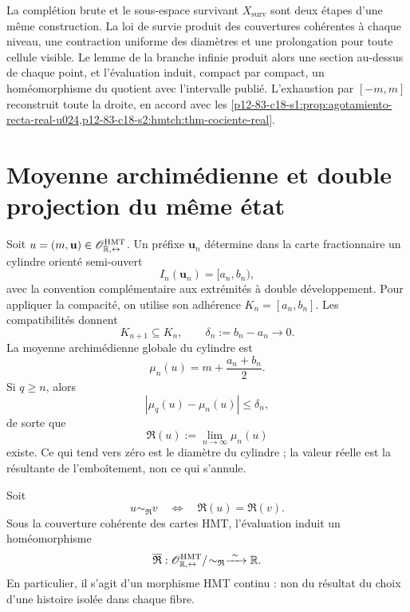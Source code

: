 \begin{remark}
\label{p12-83-c18-s2:hmtch:rem-version-superviviente}
La complétion brute et le sous-espace survivant
\(X_{\mathrm{surv}}\) sont deux étapes d'une même construction. La loi de
survie produit des couvertures cohérentes à chaque niveau, une contraction
uniforme des diamètres et une prolongation pour toute cellule visible. Le lemme
de la branche infinie produit alors une section au-dessus de chaque point, et
l'évaluation induit, compact par compact, un homéomorphisme du quotient avec
l'intervalle publié. L'exhaustion par \([-m,m]\) reconstruit toute la droite,
en accord avec les
\cref{p12-83-c18-s1:prop:agotamiento-recta-real-u024,p12-83-c18-s2:hmtch:thm-cociente-real}.
\end{remark}

\section{Moyenne archimédienne et double projection du même état}

Soit \(u=(m,\mathbf u)\in
\mathscr O_{\mathbb R,\leftrightarrow}^{\rm HMT}\). Un préfixe
\(\mathbf u_n\) détermine dans la carte fractionnaire un cylindre orienté
semi-ouvert
\[
 I_n(\mathbf u_n)=[a_n,b_n),
\]
avec la convention complémentaire aux extrémités à double développement. Pour
appliquer la compacité, on utilise son adhérence
\(K_n=[a_n,b_n]\). Les compatibilités donnent
\[
 K_{n+1}\subseteq K_n,
 \qquad
 \delta_n:=b_n-a_n\longrightarrow0.
\]
La moyenne archimédienne globale du cylindre est
\[
 \mu_n(u)=m+\frac{a_n+b_n}{2}.
\]
Si \(q\geq n\), alors
\[
 |\mu_q(u)-\mu_n(u)|\leq\delta_n,
\]
de sorte que
\begin{equation}
 \mathfrak R(u):=\lim_{n\to\infty}\mu_n(u)
 \label{p12-83-c18-s2:hmtch:eq-media-arquimediana}
\end{equation}
existe. Ce qui tend vers zéro est le diamètre du cylindre ; la valeur réelle est
la résultante de l'emboîtement, non ce qui s'annule.

\begin{theorem}
\label{p12-83-c18-s2:hmtch:thm-cociente-two-way-real}
Soit
\[
 u\sim_{\mathfrak R}v
 \quad\Longleftrightarrow\quad
 \mathfrak R(u)=\mathfrak R(v).
\]
Sous la couverture cohérente des cartes HMT, l'évaluation induit un
homéomorphisme
\begin{equation}
 \overline{\mathfrak R}:
 \mathscr O_{\mathbb R,\leftrightarrow}^{\rm HMT}/\!
 \sim_{\mathfrak R}
 \xrightarrow{\ \sim\ }\mathbb R.
 \label{p12-83-c18-s2:hmtch:eq-homeomorfismo-two-way-real}
\end{equation}
En particulier, il s'agit d'un morphisme HMT continu : non du résultat du choix
d'une histoire isolée dans chaque fibre.
\end{theorem}

